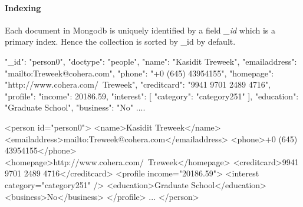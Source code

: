 \paragraph{Indexing} 
	Each document in Mongodb is uniquely identified by a field \textit{\_id} which is a primary index. Hence the collection is sorted by \_id by default. ~\cite{nosql/comparision}
	


\begin{fakeJSON}[label=json,caption=Mongodb data representation of XMARk data]
	{
		"_id": "person0",
		"doctype": "people",
		"name": "Kasidit Treweek",
		"emailaddress": "mailto:Treweek@cohera.com",
		"phone": "+0 (645) 43954155",
		"homepage": "http://www.cohera.com/~Treweek",
		"creditcard": "9941 9701 2489 4716",
		"profile": {
			"income": 20186.59,
			"interest": [{
				"category": "category251"
			}],
			"education": "Graduate School",
			"business": "No"
		}
		....
	}
\end{fakeJSON} 

\begin{fakeXML}[label=xml,caption=XMARK data with of \textit{person0}]
	
	<person id="person0">
	<name>Kasidit Treweek</name>
	<emailaddress>mailto:Treweek@cohera.com</emailaddress>
	<phone>+0 (645) 43954155</phone>
	<homepage>http://www.cohera.com/~Treweek</homepage>
	<creditcard>9941 9701 2489 4716</creditcard>
	<profile income="20186.59">
	<interest category="category251" />
	<education>Graduate School</education>
	<business>No</business>
	</profile>
	...
	</person>
\end{fakeXML} 

	

	
	
